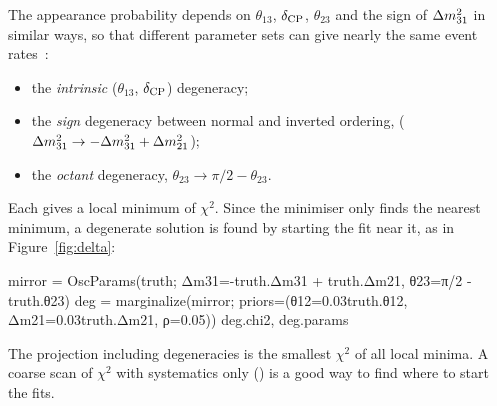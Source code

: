 The appearance probability depends on $\theta_{13}$, $\delta_\mathrm{CP}$, $\theta_{23}$ and
the sign of $\Delta m^2_{31}$ in similar ways, so that different parameter sets can
give nearly the same event rates~\cite{Barger:2001yr}:
\begin{itemize}
\item the \emph{intrinsic} ($\theta_{13}$, $\delta_\mathrm{CP}$) degeneracy;
\item the \emph{sign} degeneracy between normal and inverted ordering,
  ($\Delta m^2_{31}\to-\Delta m^2_{31}+\Delta m^2_{21}$);
\item the \emph{octant} degeneracy, $\theta_{23}\to\pi/2-\theta_{23}$.
\end{itemize}
Each gives a local minimum of $\chi^2$. Since the minimiser only finds the
nearest minimum, a degenerate solution is found by starting the fit near it,
as in Figure~\ref{fig:delta}:
\begin{julia}
mirror = OscParams(truth; Δm31=-truth.Δm31 + truth.Δm21, θ23=π/2 - truth.θ23)
deg = marginalize(mirror; priors=(θ12=0.03truth.θ12, Δm21=0.03truth.Δm21, ρ=0.05))
deg.chi2, deg.params
\end{julia}
The projection including degeneracies is the smallest $\chi^2$ of all local
minima. A coarse scan of $\chi^2$ with systematics only () is
a good way to find where to start the fits.
